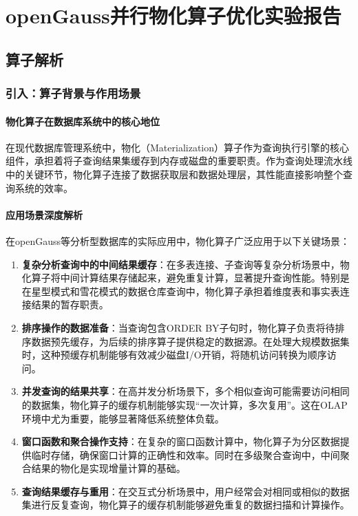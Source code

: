 \chapter{openGauss并行物化算子优化实验报告}

\section{算子解析}

\subsection{引入：算子背景与作用场景}

\subsubsection{物化算子在数据库系统中的核心地位}

在现代数据库管理系统中，物化（Materialization）算子作为查询执行引擎的核心组件，承担着将子查询结果集缓存到内存或磁盘的重要职责\cite{li2021opengauss}。作为查询处理流水线中的关键环节，物化算子连接了数据获取层和数据处理层，其性能直接影响整个查询系统的效率。

\subsubsection{应用场景深度解析}

在openGauss等分析型数据库的实际应用中，物化算子广泛应用于以下关键场景：

\begin{enumerate}[topsep = 0 pt, itemsep= 0 pt, parsep=0pt, partopsep=0pt, leftmargin=44pt, itemindent=0pt, labelsep=6pt, label=(\arabic*)]
    \item \textbf{复杂分析查询中的中间结果缓存}：在多表连接、子查询等复杂分析场景中，物化算子将中间计算结果存储起来，避免重复计算，显著提升查询性能。特别是在星型模式和雪花模式的数据仓库查询中，物化算子承担着维度表和事实表连接结果的暂存职责。
    
    \item \textbf{排序操作的数据准备}：当查询包含ORDER BY子句时，物化算子负责将待排序数据预先缓存，为后续的排序算子提供稳定的数据源。在处理大规模数据集时，这种预缓存机制能够有效减少磁盘I/O开销，将随机访问转换为顺序访问。
    
    \item \textbf{并发查询的结果共享}：在高并发分析场景下，多个相似查询可能需要访问相同的数据集，物化算子的缓存机制能够实现“一次计算，多次复用”。这在OLAP环境中尤为重要，能够显著降低系统整体负载。
    
    \item \textbf{窗口函数和聚合操作支持}：在复杂的窗口函数计算中，物化算子为分区数据提供临时存储，确保窗口计算的正确性和效率。同时在多级聚合查询中，中间聚合结果的物化是实现增量计算的基础。
    
    \item \textbf{查询结果缓存与重用}：在交互式分析场景中，用户经常会对相同或相似的数据集进行反复查询，物化算子的缓存机制能够避免重复的数据扫描和计算操作。
\end{enumerate}

